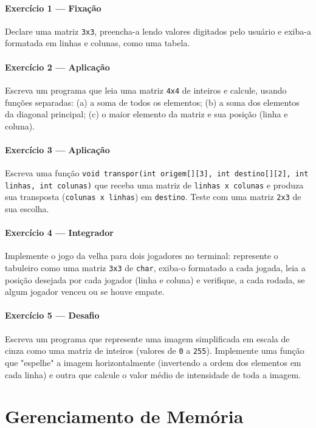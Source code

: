 \documentclass[12pt,a4paper,oneside]{extreport}
\begin{document}
\subsection*{Exercício 1 --- Fixação}
Declare uma matriz \texttt{3x3}, preencha-a lendo valores digitados pelo usuário e exiba-a formatada em linhas e colunas, como uma tabela.

\subsection*{Exercício 2 --- Aplicação}
Escreva um programa que leia uma matriz \texttt{4x4} de inteiros e calcule, usando funções separadas: (a) a soma de todos os elementos; (b) a soma dos elementos da diagonal principal; (c) o maior elemento da matriz e sua posição (linha e coluna).

\subsection*{Exercício 3 --- Aplicação}
Escreva uma função \texttt{void transpor(int origem[][3], int destino[][2], int linhas, int colunas)} que receba uma matriz de \texttt{linhas x colunas} e produza sua transposta (\texttt{colunas x linhas}) em \texttt{destino}. Teste com uma matriz \texttt{2x3} de sua escolha.

\subsection*{Exercício 4 --- Integrador}
Implemente o jogo da velha para dois jogadores no terminal: represente o tabuleiro como uma matriz \texttt{3x3} de \texttt{char}, exiba-o formatado a cada jogada, leia a posição desejada por cada jogador (linha e coluna) e verifique, a cada rodada, se algum jogador venceu ou se houve empate.

\subsection*{Exercício 5 --- Desafio}
Escreva um programa que represente uma imagem simplificada em escala de cinza como uma matriz de inteiros (valores de \texttt{0} a \texttt{255}). Implemente uma função que "espelhe" a imagem horizontalmente (invertendo a ordem dos elementos em cada linha) e outra que calcule o valor médio de intensidade de toda a imagem.

\part{Gerenciamento de Memória}
\end{document}
